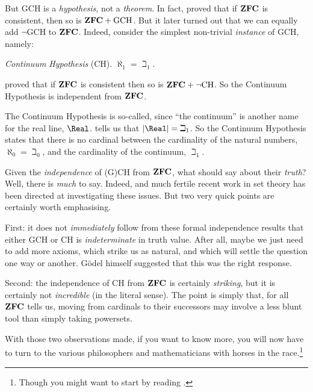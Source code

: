 \documentclass[../../../include/open-logic-section]{subfiles}
\begin{document}
But GCH is a \emph{hypothesis}, not a \emph{theorem}. In fact,
\citet{Godel1938} proved that if $\mathbf{ZFC}$ is consistent, then so is
$\mathbf{ZFC} + \text{GCH}$. But it later turned out that we can equally add
$\lnot$GCH to $\mathbf{ZFC}$. Indeed, consider the simplest non-trivial
\emph{instance} of GCH, namely: 

\begin{defish}
\emph{Continuum Hypothesis} (CH). $\aleph_1 = \beth_1$. 
\end{defish}

\citet{Cohen1963} proved that if $\mathbf{ZFC}$ is consistent then so is $\mathbf{ZFC}
+ \lnot\text{CH}$. So the Continuum Hypothesis is independent from $\mathbf{ZFC}$.

The Continuum Hypothesis is so-called, since ``the continuum'' is
another name for the real line, $\Real$.
 tells us that $\card{\Real} =
\beth_1$. So the Continuum Hypothesis states that there is no cardinal
between the cardinality of the natural numbers, $\aleph_0 = \beth_0$,
and the cardinality of the continuum, $\beth_1$.

Given the \emph{independence} of (G)CH from $\mathbf{ZFC}$, what should say
about their \emph{truth}? Well, there is \emph{much} to say. Indeed,
and much fertile recent work in set theory has been directed at
investigating these issues. But two very quick points are certainly worth
emphasising. 

First: it does not \emph{immediately} follow from these formal
independence results that either GCH or CH is \emph{indeterminate} in
truth value. After all, maybe we just need to add more axioms, which
strike us as natural, and which will settle the question one way or
another. G\"odel himself suggested that this was the right response. 

Second: the independence of CH from $\mathbf{ZFC}$ is certainly
\emph{striking}, but it is certainly not \emph{incredible} (in the
literal sense). The point is simply that, for all $\mathbf{ZFC}$ tells us,
moving from cardinals to their successors may involve a less blunt
tool than simply taking powersets.

With those two observations made, if you want to know more, you will
now have to turn to the various philosophers and mathematicians with
horses in the race.\footnote{Though you might want to start by reading \citet[\S15.6]{Potter2004}.}
\end{document}
